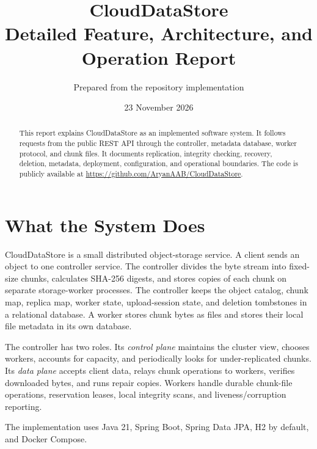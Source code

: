 \documentclass[11pt,a4paper]{article}
\title{\textbf{CloudDataStore}\\[0.35em]\large Detailed Feature, Architecture, and Operation Report}
\author{Prepared from the repository implementation}
\date{23 November 2026}
\begin{document}
\maketitle
\begin{abstract}
This report explains CloudDataStore as an implemented software system. It follows requests from the public REST API through the controller, metadata database, worker protocol, and chunk files. It documents replication, integrity checking, recovery, deletion, metadata, deployment, configuration, and operational boundaries. The code is publicly available at \url{https://github.com/AryanAAB/CloudDataStore}.
\end{abstract}
\tableofcontents
\newpage

\section{What the System Does}
CloudDataStore is a small distributed object-storage service. A client sends an object to one controller service. The controller divides the byte stream into fixed-size chunks, calculates SHA-256 digests, and stores copies of each chunk on separate storage-worker processes. The controller keeps the object catalog, chunk map, replica map, worker state, upload-session state, and deletion tombstones in a relational database. A worker stores chunk bytes as files and stores their local file metadata in its own database.

The controller has two roles. Its \emph{control plane} maintains the cluster view, chooses workers, accounts for capacity, and periodically looks for under-replicated chunks. Its \emph{data plane} accepts client data, relays chunk operations to workers, verifies downloaded bytes, and runs repair copies. Workers handle durable chunk-file operations, reservation leases, local integrity scans, and liveness/corruption reporting.

The implementation uses Java 21, Spring Boot, Spring Data JPA, H2 by default, and Docker Compose.
\end{document}
